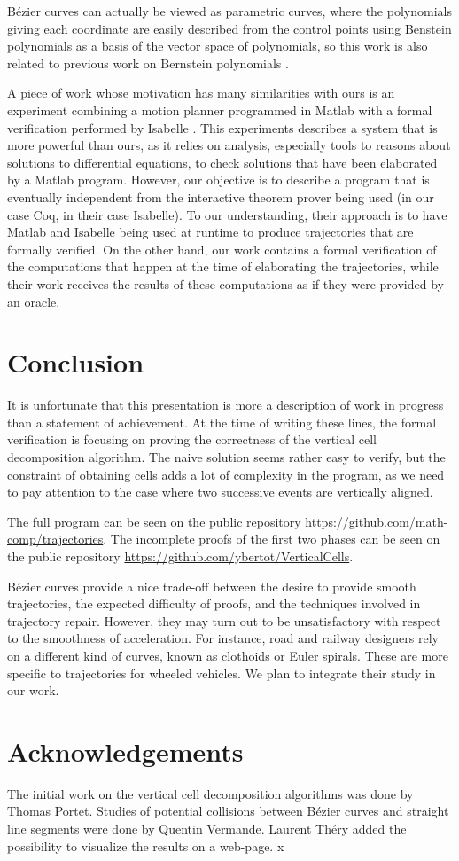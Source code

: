 \documentclass{easychair}
\begin{document}
Bézier curves can actually be viewed as parametric curves, where the
polynomials giving each coordinate are easily described from the
control points using Benstein polynomials as a basis of the vector
space of polynomials, so this work is also related to previous work on
Bernstein polynomials \cite{BertotMahboubiGuilhot}.

A piece of work whose motivation has many similarities with ours
is an experiment combining a motion planner programmed in Matlab with
a formal verification performed by Isabelle \cite{RizaldiISA18}.  This
experiments describes a system that is more powerful than ours, as it
relies on analysis, especially tools to reasons about solutions to
differential equations, to check solutions that have been elaborated by a
Matlab program.  However, our objective is to describe a program that
is eventually independent from the interactive theorem prover being
used (in our case Coq, in their case Isabelle).  To our understanding,
their approach is to have Matlab and Isabelle being used at runtime to
produce trajectories that are formally verified.  On the other hand,
our work contains a formal verification of the computations that happen at
the time of elaborating the trajectories, while their work receives
the results of these computations as if they were provided by an oracle.

\section{Conclusion}
It is unfortunate that this presentation is more a description of work
in progress than a statement of achievement.  At the time of writing
these lines, the formal verification
is focusing on proving the correctness of the vertical cell
decomposition algorithm.  The naive solution seems rather easy to
verify, but the constraint of obtaining cells adds a lot of complexity
in the program, as we need to pay attention to the case where two
successive events are vertically aligned.

The full program can be seen on the public repository \url{https://github.com/math-comp/trajectories}.  The incomplete proofs of the first two phases can be seen on the public repository \url{https://github.com/ybertot/VerticalCells}.

Bézier curves provide a nice trade-off between the desire to provide smooth
trajectories, the expected difficulty of proofs, and the techniques involved
in trajectory repair.  However, they may turn out to be unsatisfactory with
respect to the smoothness of acceleration.  For instance, road and railway
designers rely on a different kind of curves, known as clothoids or Euler
spirals.  These are more specific to trajectories for wheeled vehicles.
We plan to integrate their study in our work.
\section*{Acknowledgements}
The initial work on the vertical cell decomposition algorithms was
done by Thomas Portet.  Studies of potential collisions between Bézier
curves and straight line segments were done by Quentin Vermande.
Laurent Théry added the possibility to visualize the results on a
web-page.
x


\end{document}
